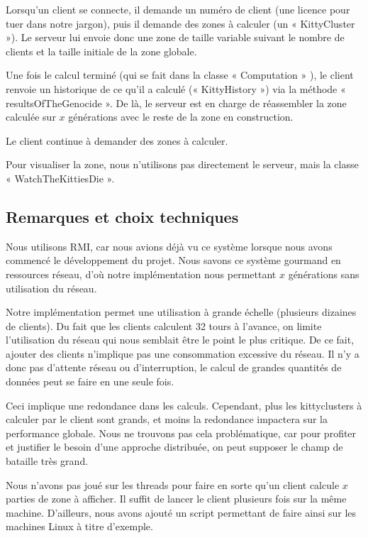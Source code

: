 \documentclass[twoside]{article}
\begin{document}
Lorsqu'un client se connecte, il demande un numéro de client (une licence pour tuer dans notre jargon), puis il demande des zones à calculer (un « KittyCluster »).
Le serveur lui envoie donc une zone de taille variable suivant le nombre de clients et la taille initiale de la zone globale.

Une fois le calcul terminé (qui se fait dans la classe « Computation » ), le client renvoie un historique de ce qu'il a calculé (« KittyHistory ») via la méthode « resultsOfTheGenocide ».
De là, le serveur est en charge de réassembler la zone calculée sur $x$ générations avec le reste de la zone en construction.

Le client continue à demander des zones à calculer.

Pour visualiser la zone, nous n'utilisons pas directement le serveur, mais la classe « WatchTheKittiesDie ».

\subsection{Remarques et choix techniques}
Nous utilisons RMI, car nous avions déjà vu ce système lorsque nous avons commencé le développement du projet.
Nous savons ce système gourmand en ressources réseau, d'où notre implémentation nous permettant $x$ générations sans utilisation du réseau.

Notre implémentation permet une utilisation à grande échelle (plusieurs dizaines de clients).
Du fait que les clients calculent 32 tours à l'avance, on limite l'utilisation du réseau qui nous semblait être le point le plus critique.
De ce fait, ajouter des clients n'implique pas une consommation excessive du réseau.
Il n'y a donc pas d'attente réseau ou d'interruption, le calcul de grandes quantités de données peut se faire en une seule fois.

Ceci implique une redondance dans les calculs.
Cependant, plus les kittyclusters à calculer par le client sont grands, et moins la redondance impactera sur la performance globale.
Nous ne trouvons pas cela problématique, car pour profiter et justifier le besoin d'une approche distribuée, on peut supposer le champ de bataille très grand.

Nous n'avons pas joué sur les threads pour faire en sorte qu'un client calcule $x$ parties de zone à afficher.
Il suffit de lancer le client plusieurs fois sur la même machine.
D'ailleurs, nous avons ajouté un script permettant de faire ainsi sur les machines Linux à titre d'exemple.
\end{document}
